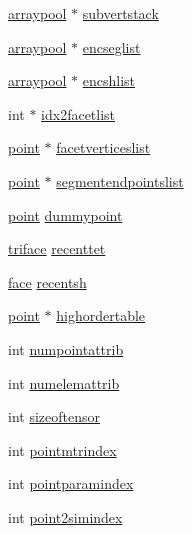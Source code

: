 \begin{DoxyCompactItemize}
\item 
\hyperlink{classtetgenmesh_1_1arraypool}{arraypool} $\ast$ \hyperlink{classtetgenmesh_ad27e70e870354da31dad1eb8219c521f}{subvertstack}
\item 
\hyperlink{classtetgenmesh_1_1arraypool}{arraypool} $\ast$ \hyperlink{classtetgenmesh_abc420f3eb006345cfd37515eda36e1cc}{encseglist}
\item 
\hyperlink{classtetgenmesh_1_1arraypool}{arraypool} $\ast$ \hyperlink{classtetgenmesh_a8680cdcf4cd31d633e31900455694208}{encshlist}
\item 
int $\ast$ \hyperlink{classtetgenmesh_a75a402b43e633616f8cb7bc24e472cd8}{idx2facetlist}
\item 
\hyperlink{classtetgenmesh_ace3fb4f80389185b7c9b18ab69a3dea2}{point} $\ast$ \hyperlink{classtetgenmesh_ae81c6bea0222ac8e6798145d999bf487}{facetverticeslist}
\item 
\hyperlink{classtetgenmesh_ace3fb4f80389185b7c9b18ab69a3dea2}{point} $\ast$ \hyperlink{classtetgenmesh_a94baa4b30f5978236d410519d2630f7a}{segmentendpointslist}
\item 
\hyperlink{classtetgenmesh_ace3fb4f80389185b7c9b18ab69a3dea2}{point} \hyperlink{classtetgenmesh_a5b9c064585da367f7e2629ef7985be29}{dummypoint}
\item 
\hyperlink{classtetgenmesh_1_1triface}{triface} \hyperlink{classtetgenmesh_ae18c5fda5cd5ef44db455a71b875b48a}{recenttet}
\item 
\hyperlink{classtetgenmesh_1_1face}{face} \hyperlink{classtetgenmesh_a4a048baa9087fca5c9ce9df91ad3a60f}{recentsh}
\item 
\hyperlink{classtetgenmesh_ace3fb4f80389185b7c9b18ab69a3dea2}{point} $\ast$ \hyperlink{classtetgenmesh_a0b9050e5833840e66115d4ebf85f88a3}{highordertable}
\item 
int \hyperlink{classtetgenmesh_a8d402a03733939c8d5e97438f39fe2d3}{numpointattrib}
\item 
int \hyperlink{classtetgenmesh_afa4868ef4bde3366091028bcb3cf96c0}{numelemattrib}
\item 
int \hyperlink{classtetgenmesh_a7b22b70662c2fe714e5eb9264c56c47b}{sizeoftensor}
\item 
int \hyperlink{classtetgenmesh_a35cfa4e4a0a5e8b1ef5dcded6b95f202}{pointmtrindex}
\item 
int \hyperlink{classtetgenmesh_a6e119fd6f1234c3215f93b1443a554ce}{pointparamindex}
\item 
int \hyperlink{classtetgenmesh_aea77ee16cf3d9867922553b4eb740fd0}{point2simindex}
\item 

\end{DoxyCompactItemize}
